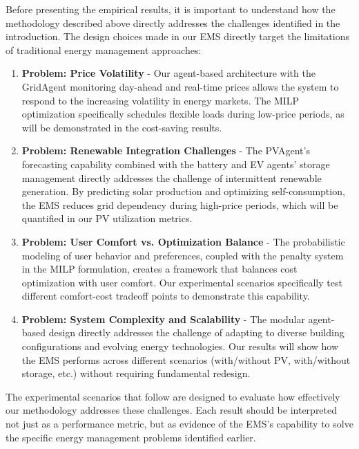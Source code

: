 \documentclass[12pt,a4paper]{article}
\begin{document}
Before presenting the empirical results, it is important to understand how the methodology described above directly addresses the challenges identified in the introduction. The design choices made in our EMS directly target the limitations of traditional energy management approaches:

\begin{enumerate}
    \item \textbf{Problem: Price Volatility} - Our agent-based architecture with the GridAgent monitoring day-ahead and real-time prices allows the system to respond to the increasing volatility in energy markets. The MILP optimization specifically schedules flexible loads during low-price periods, as will be demonstrated in the cost-saving results.
    
    \item \textbf{Problem: Renewable Integration Challenges} - The PVAgent's forecasting capability combined with the battery and EV agents' storage management directly addresses the challenge of intermittent renewable generation. By predicting solar production and optimizing self-consumption, the EMS reduces grid dependency during high-price periods, which will be quantified in our PV utilization metrics.
    
    \item \textbf{Problem: User Comfort vs. Optimization Balance} - The probabilistic modeling of user behavior and preferences, coupled with the penalty system in the MILP formulation, creates a framework that balances cost optimization with user comfort. Our experimental scenarios specifically test different comfort-cost tradeoff points to demonstrate this capability.
    
    \item \textbf{Problem: System Complexity and Scalability} - The modular agent-based design directly addresses the challenge of adapting to diverse building configurations and evolving energy technologies. Our results will show how the EMS performs across different scenarios (with/without PV, with/without storage, etc.) without requiring fundamental redesign.
\end{enumerate}

The experimental scenarios that follow are designed to evaluate how effectively our methodology addresses these challenges. Each result should be interpreted not just as a performance metric, but as evidence of the EMS's capability to solve the specific energy management problems identified earlier.
\end{document}
